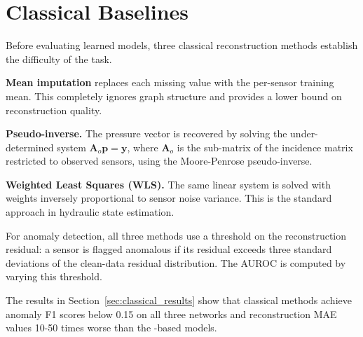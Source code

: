 \section{Classical Baselines}
\label{sec:classical_baselines}

Before evaluating learned models, three classical reconstruction
methods establish the difficulty of the task.

\textbf{Mean imputation} replaces each missing value with the
per-sensor training mean. This completely ignores graph structure
and provides a lower bound on reconstruction quality.

\textbf{Pseudo-inverse.} The pressure vector is recovered by solving
the under-determined system $\mathbf{A}_o \mathbf{p} = \mathbf{y}$,
where $\mathbf{A}_o$ is the sub-matrix of the incidence matrix
restricted to observed sensors, using the Moore-Penrose pseudo-inverse.

\textbf{Weighted Least Squares (WLS).} The same linear system is
solved with weights inversely proportional to sensor noise variance.
This is the standard approach in hydraulic state estimation.

For anomaly detection, all three methods use a threshold on the
reconstruction residual: a sensor is flagged anomalous if its
residual exceeds three standard deviations of the clean-data residual
distribution. The AUROC is computed by varying this
threshold.

The results in Section~\ref{sec:classical_results} show that classical
methods achieve anomaly F1 scores below 0.15 on all three networks
and reconstruction MAE values 10-50 times worse than the
\gnn{}-based models.
